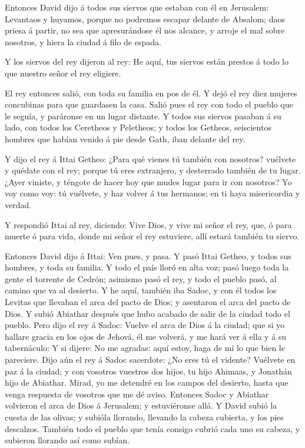  Entonces David dijo á todos sus siervos que estaban con él
en Jerusalem: Levantaos y huyamos, porque no podremos escapar delante de
Absalom; daos priesa á partir, no sea que apresurándose él nos alcance,
y arroje el mal sobre nosotros, y hiera la ciudad á filo de espada.

 Y los siervos del rey dijeron al rey: He aquí, tus siervos
están prestos á todo lo que nuestro señor el rey eligiere.

 El rey entonces salió, con toda su familia en pos de él. Y
dejó el rey diez mujeres concubinas para que guardasen la casa.
 Salió pues el rey con todo el pueblo que le seguía, y
paráronse en un lugar distante.  Y todos sus siervos
pasaban á su lado, con todos los Ceretheos y Peletheos; y todos los
Getheos, seiscientos hombres que habían venido á pie desde Gath, iban
delante del rey.

 Y dijo el rey á Ittai Getheo: ¿Para qué vienes tú también
con nosotros? vuélvete y quédate con el rey; porque tú eres extranjero,
y desterrado también de tu lugar.  ¿Ayer viniste, y téngote
de hacer hoy que mudes lugar para ir con nosotros? Yo voy como voy: tú
vuélvete, y haz volver á tus hermanos; en ti haya misericordia y verdad.

 Y respondió Ittai al rey, diciendo: Vive Dios, y vive mi
señor el rey, que, ó para muerte ó para vida, donde mi señor el rey
estuviere, allí estará también tu siervo.

 Entonces David dijo á Ittai: Ven pues, y pasa. Y pasó
Ittai Getheo, y todos sus hombres, y toda su familia.  Y
todo el país lloró en alta voz; pasó luego toda la gente el torrente de
Cedrón; asimismo pasó el rey, y todo el pueblo pasó, al camino que va al
desierto.  Y he aquí, también iba Sadoc, y con él todos los
Levitas que llevaban el arca del pacto de Dios; y asentaron el arca del
pacto de Dios. Y subió Abiathar después que hubo acabado de salir de la
ciudad todo el pueblo.  Pero dijo el rey á Sadoc: Vuelve el
arca de Dios á la ciudad; que si yo hallare gracia en los ojos de
Jehová, él me volverá, y me hará ver á ella y á su tabernáculo:
 Y si dijere: No me agradas: aquí estoy, haga de mí lo que
bien le pareciere.  Dijo aún el rey á Sadoc sacerdote: ¿No
eres tú el vidente? Vuélvete en paz á la ciudad; y con vosotros vuestros
dos hijos, tu hijo Ahimaas, y Jonathán hijo de Abiathar. 
Mirad, yo me detendré en los campos del desierto, hasta que venga
respuesta de vosotros que me dé aviso.  Entonces Sadoc y
Abiathar volvieron el arca de Dios á Jerusalem; y estuviéronse allá.
 Y David subió la cuesta de las olivas; y subióla llorando,
llevando la cabeza cubierta, y los pies descalzos. También todo el
pueblo que tenía consigo cubrió cada uno su cabeza, y subieron llorando
así como subían.

